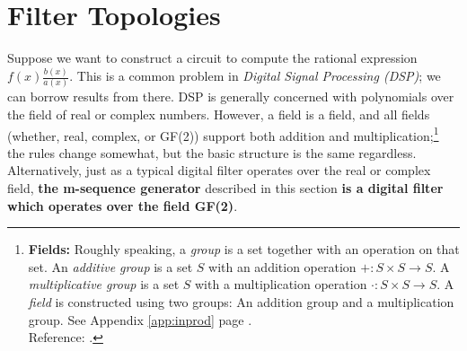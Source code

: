 
\chapter{Filter Topologies}
\label{chp:filtertop}
Suppose we want to construct a circuit to compute the 
rational expression $f(x)\frac{b(x)}{a(x)}$.
This is a common problem in {\em Digital Signal Processing (DSP)};
we can borrow results from there.
DSP is generally concerned with polynomials over the field of real or complex numbers.
However, a field is a field, and all fields (whether, real, complex, or GF(2))
support both addition and multiplication;\footnote{
   {\bf Fields:} Roughly speaking, a {\em group} is a set together with an operation 
   on that set.  
   An {\em additive group} is a set $S$ 
   with an addition operation $+:S\times S\to S$.
   A {\em multiplicative group} is a set $S$ 
   with a multiplication operation $\cdot:S\times S\to S$.
   A {\em field} is constructed using two groups: 
   An addition group and a multiplication group.
   See Appendix \ref{app:inprod} page \pageref{app:inprod}.\\
   Reference: \cite[p.123]{durbin}.
   }
the rules change somewhat, but the basic structure is the same regardless.
Alternatively, just as a typical digital filter operates over the real 
or complex field, 
{\bf the m-sequence generator} described in this section
{\bf is a digital filter which operates over the field GF(2)}.

